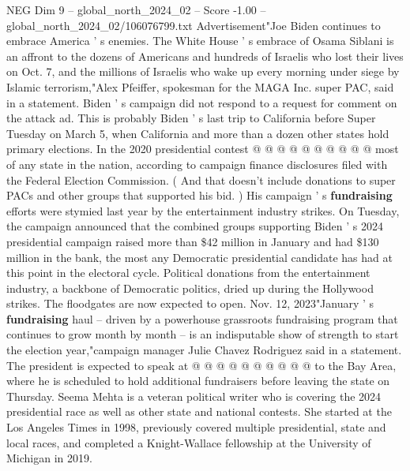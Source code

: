 \begin{textsample}{NEG Dim 9 – global\_north\_2024\_02 – Score -1.00 – global\_north\_2024\_02/106076799.txt}
Advertisement"Joe Biden continues to embrace America ' s enemies.
The White House ' s embrace of Osama Siblani is an affront to the dozens of Americans and hundreds of Israelis who lost their lives on Oct. 7, and the millions of Israelis who wake up every morning under siege by Islamic terrorism,"Alex Pfeiffer, spokesman for the MAGA Inc. super PAC, said in a statement.
Biden ' s campaign did not respond to a request for comment on the attack ad.
This is probably Biden ' s last trip to California before Super Tuesday on March 5, when California and more than a dozen other states hold primary elections.
In the 2020 presidential contest @ @ @ @ @ @ @ @ @ @ most of any state in the nation, according to campaign finance disclosures filed with the Federal Election Commission. ( And that doesn't include donations to super PACs and other groups that supported his bid. ) His campaign ' s \textbf{fundraising} efforts were stymied last year by the entertainment industry strikes.
On Tuesday, the campaign announced that the combined groups supporting Biden ' s 2024 presidential campaign raised more than \$42 million in January and had \$130 million in the bank, the most any Democratic presidential candidate has had at this point in the electoral cycle.
Political donations from the entertainment industry, a backbone of Democratic politics, dried up during the Hollywood strikes.
The floodgates are now expected to open.
Nov. 12, 2023"January ' s \textbf{fundraising} haul -- driven by a powerhouse grassroots fundraising program that continues to grow month by month -- is an indisputable show of strength to start the election year,"campaign manager Julie Chavez Rodriguez said in a statement.
The president is expected to speak at @ @ @ @ @ @ @ @ @ @ to the Bay Area, where he is scheduled to hold additional fundraisers before leaving the state on Thursday.
Seema Mehta is a veteran political writer who is covering the 2024 presidential race as well as other state and national contests.
She started at the Los Angeles Times in 1998, previously covered multiple presidential, state and local races, and completed a Knight-Wallace fellowship at the University of Michigan in 2019.

\end{textsample}
